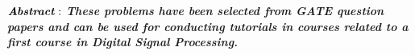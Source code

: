\documentclass[journal,12pt,twocolumn]{IEEEtran}
\begin{document}
\providecommand{\qfunc}[1]{\ensuremath{Q\left(#1\right)}}
\providecommand{\sbrak}[1]{\ensuremath{{}\left[#1\right]}}
\providecommand{\lsbrak}[1]{\ensuremath{{}\left[#1\right.}}
\providecommand{\rsbrak}[1]{\ensuremath{{}\left.#1\right]}}
\providecommand{\brak}[1]{\ensuremath{\left(#1\right)}}
\providecommand{\lbrak}[1]{\ensuremath{\left(#1\right.}}
\providecommand{\rbrak}[1]{\ensuremath{\left.#1\right)}}
\providecommand{\cbrak}[1]{\ensuremath{\left\{#1\right\}}}
\providecommand{\lcbrak}[1]{\ensuremath{\left\{#1\right.}}
\providecommand{\rcbrak}[1]{\ensuremath{\left.#1\right\}}}

\title{
}

\maketitle
$\textbf{\textit{Abstract}} :$ \textbf{\textit{These problems have been selected from
GATE question papers and can be used for conducting
tutorials in courses related to a first course in Digital Signal Processing.}}\\
\end{document}
